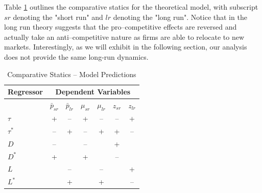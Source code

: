 Table \ref{tb:comp_stats} outlines the comparative statics for the theoretical 
model, with subscript $sr$ denoting the "short run" and $lr$ denoting the "long 
run". Notice that in the long run theory suggests that the pro--competitive 
effects are reversed and actually take an anti--competitive nature as firms are 
able to relocate to new markets. Interestingly, as we will exhibit in the 
following section, our analysis does not provide the same long-run dynamics.

\begin{center}
\begin{table}[ht] \caption{Comparative Statics -- Model Predictions}\label{tb:comp_stats}
\vspace{0.5cm}
{\small
\hfill{}
\begin{tabular}{|l|c|c|c|c|c|c|}
\hline
\textbf{Regressor}& \multicolumn{6}{|c|}{\textbf{Dependent Variables}}\\
\cline{2-7}
\hline
& $\bar{p}_{sr}$ & $\bar{p}_{lr}$ & $\mu_{sr}$ & $\mu_{lr}$ & $z_{sr}$ & $z_{lr}$ \\ \hline
$\tau$     & +  & -- & +  & -- & -- & + \\ \hline
$\tau^*$   & -- & +  & -- & +  & +  & --\\ \hline
$D$        & -- &    & -- &    & +  &   \\ \hline
$D^*$      & +  &    & +  &    & -- &   \\ \hline
$L$        &    & -- &    & -- &    & + \\ \hline
$L^*$      &    & +  &    & +  &    & --\\
\hline
\end{tabular}}
\hfill{}
\end{table}
\end{center}


